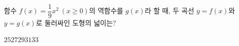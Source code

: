 함수 $f(x)=\dfrac{1}{9}x^2\ (x\ge 0)$의 역함수를 $g(x)$라 할 때, 두 곡선 $y=f(x)$와 $y=g(x)$로 둘러싸인 도형의 넓이는?
\begin{choices32}{$25$}{$27$}{$29$}{$31$}{$33$}\end{choices32}
